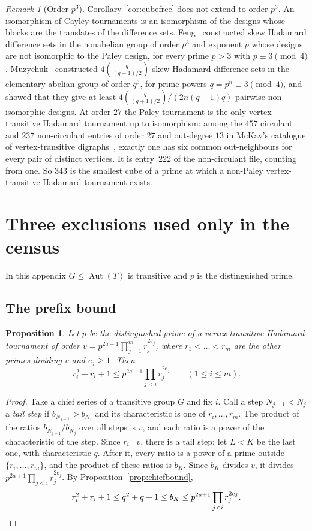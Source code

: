 \documentclass[11pt]{amsart}
\newtheorem{proposition}[theorem]{Proposition}
\theoremstyle{definition}
\theoremstyle{remark}
\newtheorem{remark}[theorem]{Remark}
\newcommand{\Aut}{\operatorname{Aut}}
\begin{document}
\begin{remark}[Order $p^3$]\label{rem:p3}
Corollary~\ref{cor:cubefree} does not extend to order $p^3$. An isomorphism of Cayley tournaments is an isomorphism of the designs whose blocks are the translates of the difference sets. Feng~\cite[Theorem~1 and Section~5]{Feng} constructed skew Hadamard difference sets in the nonabelian group of order $p^3$ and exponent $p$ whose designs are not isomorphic to the Paley design, for every prime $p>3$ with $p\equiv3\pmod4$. Muzychuk~\cite[Section~6, p.~8]{Muzychuk} constructed $4\binom{q}{(q+1)/2}$ skew Hadamard difference sets in the elementary abelian group of order $q^3$, for prime powers $q=p^n\equiv3\pmod4$, and showed that they give at least $4\binom{q}{(q+1)/2}/(2n(q-1)q)$ pairwise non-isomorphic designs. At order $27$ the Paley tournament is the only vertex-transitive Hadamard tournament up to isomorphism: among the $457$ circulant and $237$ non-circulant entries of order $27$ and out-degree $13$ in McKay's catalogue of vertex-transitive digraphs~\cite{McKay}, exactly one has six common out-neighbours for every pair of distinct vertices. It is entry~222 of the non-circulant file, counting from one. So $343$ is the smallest cube of a prime at which a non-Paley vertex-transitive Hadamard tournament exists.
\end{remark}


\appendix
\section{Three exclusions used only in the census}\label{sec:appendix}

In this appendix $G\le\Aut(T)$ is transitive and $p$ is the distinguished prime.

\subsection{The prefix bound}
\begin{proposition}\label{prop:prefix}
Let $p$ be the distinguished prime of a vertex-transitive Hadamard tournament of order $v=p^{2a+1}\prod_{j=1}^mr_j^{2e_j}$, where $r_1<\dots<r_m$ are the other primes dividing $v$ and $e_j\ge1$. Then
\[
r_i^2+r_i+1\le p^{2a+1}\prod_{j<i}r_j^{2e_j}\qquad(1\le i\le m).
\]
\end{proposition}
\begin{proof}
Take a chief series of a transitive group $G$ and fix $i$. Call a step $N_{j-1}<N_j$ a \emph{tail step} if $b_{N_{j-1}}>b_{N_j}$ and its characteristic is one of $r_i,\dots,r_m$. The product of the ratios $b_{N_{j-1}}/b_{N_j}$ over all steps is $v$, and each ratio is a power of the characteristic of the step. Since $r_i\mid v$, there is a tail step; let $L<K$ be the last one, with characteristic $q$. After it, every ratio is a power of a prime outside $\{r_i,\dots,r_m\}$, and the product of these ratios is $b_K$. Since $b_K$ divides $v$, it divides $p^{2a+1}\prod_{j<i}r_j^{2e_j}$. By Proposition~\ref{prop:chiefbound},
\[
r_i^2+r_i+1\le q^2+q+1\le b_K\le p^{2a+1}\prod_{j<i}r_j^{2e_j}.\qedhere
\]
\end{proof}
\end{document}

